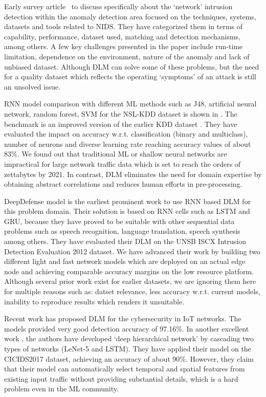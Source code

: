 \documentclass[conference]{IEEEtran}
\begin{document}
Early survey article~\cite{bhuyan2013network} to discuss specifically about the `network' intrusion detection within the anomaly detection area focused on the techniques, systems, datasets and tools related to NIDS. They have categorized them in terms of capability, performance, dataset used, matching and detection mechanisms, among others. A few key challenges presented in the paper include run-time limitation, dependence on the environment, nature of the anomaly and lack of unbiased dataset. Although DLM can solve some of these problems, but the need for a quality dataset which reflects the operating `symptoms' of an attack is still an unsolved issue.

RNN model comparison with different ML methods such as J48, artificial neural network, random forest, SVM for the NSL-KDD dataset \cite{nsl-kdd-dataset} is shown in \cite{yin2017deep}. The benchmark is an improved version of the earlier KDD dataset \cite{stolfo2000cost}. They have evaluated the impact on accuracy  w.r.t. classification (binary and multiclass), number of neurons and diverse learning rate reaching accuracy values of about 83\%.
We found out that traditional ML or shallow neural networks are impractical for large network traffic data which is set to reach the orders of zettabytes by 2021. In contrast, DLM eliminates the need for domain expertise by obtaining abstract correlations and reduces human efforts in pre-processing. 

DeepDefense model \cite{yuan2017deepdefense} is the earliest prominent work to use RNN based DLM for this problem domain. Their solution is based on RNN cells such as LSTM and GRU, because they have proved to be suitable with other sequential data problems such as speech recognition, language translation, speech synthesis among others. They have evaluated their DLM on the UNSB ISCX Intrusion Detection Evaluation 2012 dataset. 
We have advanced their work by building two different light and fast network models which are deployed on an actual edge node and achieving comparable accuracy margins on the low resource platform. 
Although several prior work exist for earlier datasets, we are ignoring them here for multiple reasons such as: datset relevance, less accuracy w.r.t. current models, inability to reproduce results which renders it unsuitable. 

Recent work \cite{roopak2019deep} has proposed DLM for the cybersecurity in IoT networks. The models provided very good detection accuracy of 97.16\%. In another excellent work \cite{zhang2019deep}, the authors have developed `deep hierarchical network' by cascading two types of networks (LeNet-5 and LSTM). They have applied their model on the CICIDS2017 \cite{sharafaldin2018toward} dataset, achieving an accuracy of about 90\%. However, they claim that their model can automatically select temporal and spatial features from existing input traffic without providing substantial details, which is a hard problem even in the ML community.
\end{document}
